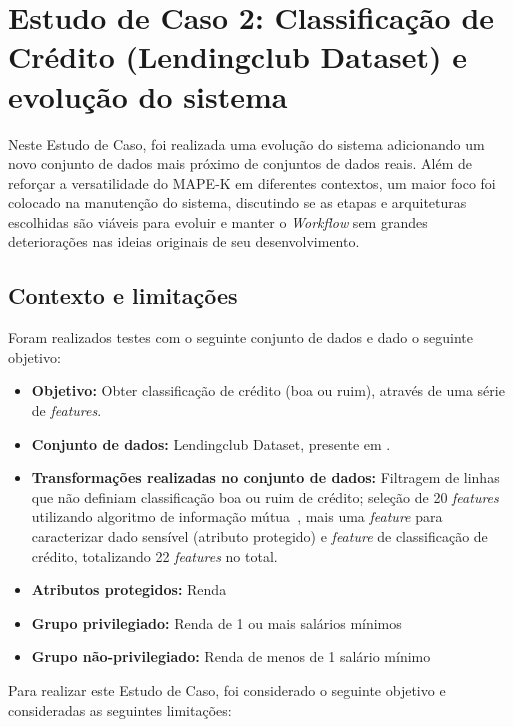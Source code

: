 \documentclass[portugues]{ic-tese}
\begin{document}
\chapter{Estudo de Caso 2: Classificação de Crédito (Lendingclub Dataset) e evolução do sistema}

Neste Estudo de Caso, foi realizada uma evolução do sistema adicionando um novo conjunto de dados mais próximo de conjuntos de dados reais. Além de reforçar a versatilidade do MAPE-K em diferentes contextos, um maior foco foi colocado na manutenção do sistema, discutindo se as etapas e arquiteturas escolhidas são viáveis para evoluir e manter o \textit{Workflow} sem grandes deteriorações nas ideias originais de seu desenvolvimento.

\section{Contexto e limitações}

Foram realizados testes com o seguinte conjunto de dados e dado o seguinte objetivo:

\begin{itemize}
\item \textbf{Objetivo:} Obter classificação de crédito (boa ou ruim), através de uma série de \textit{features}.

\item \textbf{Conjunto de dados:} Lendingclub Dataset, presente em \citep{lendingclub_2022}.

\item \textbf{Transformações realizadas no conjunto de dados:} Filtragem de linhas que não definiam classificação boa ou ruim de crédito; seleção de 20 \textit{features} utilizando algoritmo de informação mútua~\citep{Ross_2014}, mais uma \textit{feature} para caracterizar dado sensível (atributo protegido) e \textit{feature} de classificação de crédito, totalizando 22 \textit{features} no total.

\item \textbf{Atributos protegidos:} Renda

\item \textbf{Grupo privilegiado:} Renda de 1 ou mais salários mínimos

\item \textbf{Grupo não-privilegiado:} Renda de menos de 1 salário mínimo

\end{itemize}

Para realizar este Estudo de Caso, foi considerado o seguinte objetivo e consideradas as seguintes limitações:
\end{document}
